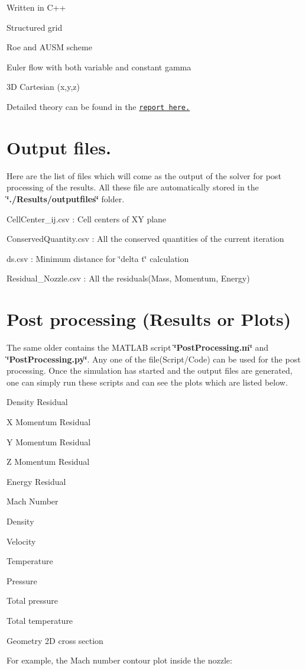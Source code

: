 \begin{DoxyItemize}
\item Written in C++
\item Structured grid
\item Roe and A\+U\+SM scheme
\item Euler flow with both variable and constant gamma
\item 3D Cartesian (x,y,z)
\item Detailed theory can be found in the \href{https://drive.google.com/open?id=0B9x_nh0D_HhzMnBjc0w5MmJpcnc}{\tt report here.}
\end{DoxyItemize}\hypertarget{index_output}{}\section{Output files.}\label{index_output}
Here are the list of files which will come as the output of the solver for post processing of the results. All these file are automatically stored in the {\bfseries \char`\"{}./\+Results/outputfiles\char`\"{}} folder.
\begin{DoxyItemize}
\item Cell\+Center\+\_\+ij.\+csv \+: Cell centers of XY plane
\item Conserved\+Quantity.\+csv \+: All the conserved quantities of the current iteration
\item ds.\+csv \+: Minimum distance for \char`\"{}delta t\char`\"{} calculation
\item Residual\+\_\+\+Nozzle.\+csv \+: All the residuals(\+Mass, Momentum, Energy)
\end{DoxyItemize}\hypertarget{index_plot}{}\section{Post processing (\+Results or Plots)}\label{index_plot}
The same older contains the M\+A\+T\+L\+AB script {\bfseries \char`\"{}\+Post\+Processing.\+m\char`\"{}} and {\bfseries \char`\"{}\+Post\+Processing.\+py\char`\"{}}. Any one of the file(Script/\+Code) can be used for the post processing. Once the simulation has started and the output files are generated, one can simply run these scripts and can see the plots which are listed below.
\begin{DoxyItemize}
\item Density Residual
\item X Momentum Residual
\item Y Momentum Residual
\item Z Momentum Residual
\item Energy Residual
\item Mach Number
\item Density
\item Velocity
\item Temperature
\item Pressure
\item Total pressure
\item Total temperature
\item Geometry 2D cross section
\end{DoxyItemize}

For example, the Mach number contour plot inside the nozzle\+:  